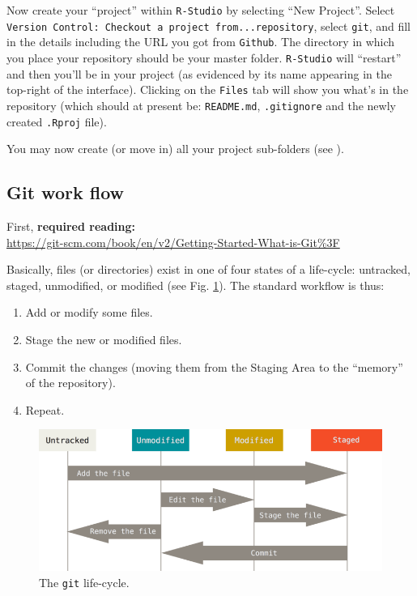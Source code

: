 \documentclass[12pt,letterpaper]{article}
\begin{document}
Now create your ``project'' within  \texttt{R-Studio} by selecting ``New Project''.  Select \texttt{Version Control: Checkout a project from...repository}, select \texttt{git}, and fill in the details including the URL you got from \texttt{Github}.  The directory in which you place your repository should be your master folder.   \texttt{R-Studio} will ``restart'' and then you'll be in your project (as evidenced by its name appearing in the top-right of the interface).  Clicking on the \texttt{Files} tab will show you what's in the repository (which should at present be: \texttt{README.md}, \texttt{.gitignore} and the newly created \texttt{.Rproj} file).

You may now create (or move in) all your project sub-folders  (see ).


\subsection{Git work flow}
First, \textbf{required reading:}\\
\url{https://git-scm.com/book/en/v2/Getting-Started-What-is-Git%3F}

Basically, files (or directories) exist in one of four states of a life-cycle: untracked, staged, unmodified, or modified (see Fig. \ref{fig:lifecycle}).  The standard workflow is thus:
\begin{enumerate}
	\item Add or modify some files.
	\item Stage the new or modified files.
	\item Commit the changes (moving them from the Staging Area to the ``memory'' of the repository).
	\item Repeat.
\end{enumerate}

\begin{figure}
	\includegraphics[width=\linewidth]{figs/lifecycle.png}
	\caption{The \texttt{git} life-cycle.}
	\label{fig:lifecycle}
\end{figure}
\end{document}

